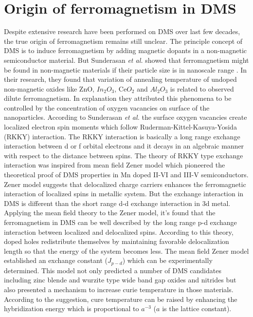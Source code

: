 \documentclass[main.tex]{subfiles}
\begin{document}
\section{Origin of ferromagnetism in DMS}

Despite extensive research have been performed on DMS over last few decades, the true origin of ferromagnetism remains still unclear. The principle concept of DMS is to induce ferromagnetism by adding magnetic dopants in a non-magnetic semiconductor material. But Sunderasan \textit{et al.} showed that ferromagnetism might be found in non-magnetic materials if their particle size is in nanoscale range \cite{sundaresan2006ferromagnetism}. In their research, they found that variation of annealing temperature of undoped non-magnetic oxides like ZnO, $In_{2}O_{3}$, Ce$O_2$ and $Al_{2}O_{3}$ is related to observed dilute ferromagnetism. In explanation they attributed this phenomena to be controlled by the concentration of oxygen vacancies on surface of the nanoparticles. According to Sunderasan \textit{et al.} the surface oxygen vacancies create localized electron spin moments which follow Ruderman-Kittel-Kasuya-Yosida (RKKY) interaction. The RKKY interaction is basically a long range exchange interaction between d or f orbital electrons and it decays in an algebraic manner with respect to the distance between spins. The theory of RKKY type exchange interaction was inspired from mean field Zener model which pioneered the theoretical proof of DMS properties in Mn doped II-VI and III-V semiconductors. \\

Zener model suggests that delocalized charge carriers enhances the ferromagnetic interaction of localized spins in metallic system. But the exchange interaction in DMS is different than the short range d-d exchange interaction in 3d metal. Applying the mean field theory to the Zener model, it's found that the ferromagnetism in DMS can be well described by the long range p-d exchange interaction between localized and delocalized spins. According to this theory, doped holes redistribute themselves by maintaining favorable delocalization length so that the energy of the system becomes less. The mean field Zener model established an exchange constant ($J_{p-d}$) which can be experimentally determined. This model not only predicted a number of DMS candidates including zinc blende and wurzite type wide band gap oxides and nitrides but also presented a mechanism to increase curie temperature in those materials. According to the suggestion, cure temperature can be raised by enhancing the hybridization energy which is proportional to $a^{-3}$ ($a$ is the lattice constant). 
\end{document}
